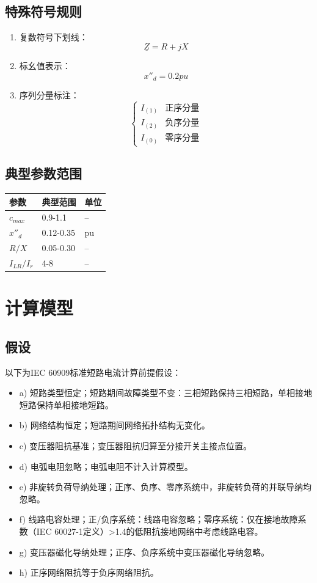 \documentclass[a4paper,11pt,AutoFakeBold]{ctexart}
\begin{document}
\subsection{特殊符号规则}
\begin{enumerate}
\item 复数符号下划线：\[ \underline{Z} = R + jX \]
\item 标幺值表示：\[ x''_d = 0.2\si{pu} \]
\item 序列分量标注：
  \[
  \begin{cases}
  I_{(1)} & \text{正序分量} \\
  I_{(2)} & \text{负序分量} \\
  I_{(0)} & \text{零序分量}
  \end{cases}
  \]
\end{enumerate}

\subsection{典型参数范围}
\begin{tabular}{lll}
参数 & 典型范围 & 单位 \\
\hline
$c_{max}$ & 0.9-1.1 & -- \\
$x''_d$ & 0.12-0.35 & \si{pu} \\
$R/X$ & 0.05-0.30 & -- \\
$I_{LR}/I_r$ & 4-8 & -- \\
\end{tabular}


\newpage
\section{计算模型}
\subsection{假设}
以下为IEC 60909标准短路电流计算前提假设：
\begin{itemize}
    \item a) 短路类型恒定；短路期间故障类型不变：三相短路保持三相短路，单相接地短路保持单相接地短路。
    \item b) 网络结构恒定；短路期间网络拓扑结构无变化。
    \item c) 变压器阻抗基准；变压器阻抗归算至分接开关主接点位置。
    \item d) 电弧电阻忽略；电弧电阻不计入计算模型。
    \item e) 非旋转负荷导纳处理；正序、负序、零序系统中，非旋转负荷的并联导纳均忽略。
    \item f) 线路电容处理；正/负序系统：线路电容忽略；零序系统：仅在接地故障系数（IEC 60027-1定义）>1.4的低阻抗接地网络中考虑线路电容。
    \item g) 变压器磁化导纳处理；正序、负序系统中变压器磁化导纳忽略。
    \item h) 正序网络阻抗等于负序网络阻抗。
\end{itemize}
\end{document}
